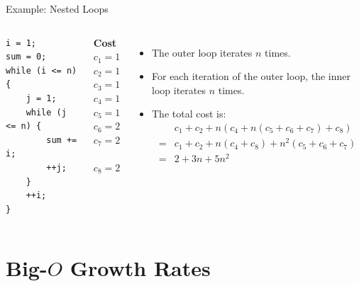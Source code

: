 \documentclass[14pt,aspectratio=1610, hyperref={pdfpagelayout=SinglePage}]{beamer}
\begin{document}
\begin{frame}[fragile]{Example: Nested Loops}
\begin{columns}[t]
\begin{lstlisting}[basicstyle=\footnotesize\ttfamily]
i = 1;
sum = 0;
while (i <= n) {
    j = 1;
    while (j <= n) {
        sum += i;
        ++j;
    }
    ++i;
}
\end{lstlisting}
{\footnotesize
\textbf{Cost}\\[6pt]
\(c_1 = 1\)\\
\(c_2 = 1\)\\
\(c_3 = 1\)\\
\(c_4 = 1\)\\
\(c_5 = 1\)\\
\(c_6 = 2\)\\
\(c_7 = 2\)\\
~\\
\(c_8 = 2\)
}




\begin{itemize}
\item <2-> The outer loop iterates \(n\) times.
\item <3-> For each iteration of the outer loop, the inner loop iterates \(n\) times.
\item <4-> The total cost is:\vspace{-1em}
  {\small
  \begin{align*}
  & c_1 + c_2 + n \left( c_4 + n \left( c_5 + c_6 + c_7 \right) + c_8 \right)\\
  = & c_1 + c_2 + n \left(c_4 + c_8\right) + n^2 \left( c_5 + c_6 + c_7 \right)\\
  = & 2 + 3n + 5n^2
  \end{align*}}
\end{itemize}
\end{columns}
\vspace{-0.5em}
\end{frame}

\section{Big-\(O\) Growth Rates}
\end{document}
